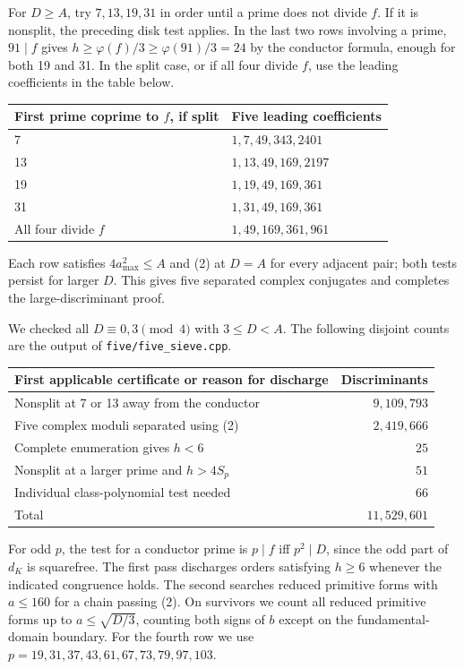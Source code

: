 For $D\ge A$, try $7,13,19,31$ in order until a prime does not divide $f$. If it is nonsplit, the preceding disk test applies. In the last two rows involving a prime, $91\mid f$ gives $h\ge\varphi(f)/3\ge\varphi(91)/3=24$ by the conductor formula, enough for both 19 and 31. In the split case, or if all four divide $f$, use the leading coefficients in the table below.
\begin{center}\small
\begin{tabular}{@{}ll@{}}\toprule
First prime coprime to $f$, if split & Five leading coefficients \\ \midrule
7 & $1,7,49,343,2401$ \\
13 & $1,13,49,169,2197$ \\
19 & $1,19,49,169,361$ \\
31 & $1,31,49,169,361$ \\
All four divide $f$ & $1,49,169,361,961$ \\ \bottomrule
\end{tabular}
\end{center}
Each row satisfies $4a_{\max}^2\le A$ and (2) at $D=A$ for every adjacent pair; both tests persist for larger $D$. This gives five separated complex conjugates and completes the large-discriminant proof.

\clearpage
{} We checked all $D\equiv0,3\pmod4$ with $3\le D<A$. The following disjoint counts are the output of \texttt{five/five\_sieve.cpp}.
\begin{center}\small
\begin{tabular}{@{}lr@{}}\toprule
First applicable certificate or reason for discharge & Discriminants \\ \midrule
Nonsplit at 7 or 13 away from the conductor & $9{,}109{,}793$ \\
Five complex moduli separated using (2) & $2{,}419{,}666$ \\
Complete enumeration gives $h<6$ & $25$ \\
Nonsplit at a larger prime and $h>4 S_p$ & $51$ \\
Individual class-polynomial test needed & $66$ \\ \midrule
Total & $11{,}529{,}601$ \\ \bottomrule
\end{tabular}
\end{center}
For odd $p$, the test for a conductor prime is $p\mid f$ iff $p^2\mid D$, since the odd part of $d_K$ is squarefree. The first pass discharges orders satisfying $h\ge6$ whenever the indicated congruence holds. The second searches reduced primitive forms with $a\le160$ for a chain passing (2). On survivors we count all reduced primitive forms up to $a\le\sqrt{D/3}$, counting both signs of $b$ except on the fundamental-domain boundary. For the fourth row we use $p=19,31,37,43,61,67,73,79,97,103$.

